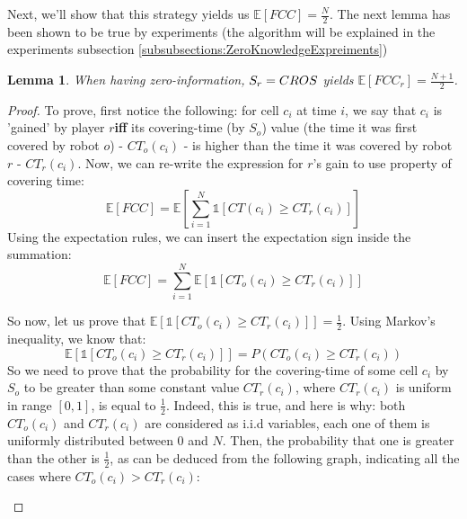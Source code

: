 \documentclass[a4paper,10pt]{article}
\newtheorem{lemma}[theorem]{Lemma}
\newcommand\rob{\ensuremath{r}\xspace}
\newcommand\opp{\ensuremath{o}\xspace}
\newcommand{\fcc}{\ensuremath{FCC}\xspace}
\newcommand{\cros}{\ensuremath{CROS}\xspace}
\begin{document}
Next, we'll show that this strategy yields us $\mathbb{E}[\fcc]=\frac{N}{2}$. The next lemma has been shown to be true by experiments (the algorithm will be explained in the experiments subsection \ref{subsubsections:ZeroKnowledgeExpreiments})

\begin{lemma}\label{lemmas:ZeroKnowledgeEFCC}
When having zero-information, $S_{\rob}=\textbf{\cros}$ yields $\mathbb{E}[\fcc_{\rob}]=\frac{N+1}{2}$.
\end{lemma}

\begin{proof}
To prove, first notice the following: for cell $c_i$ at time $i$, we say that $c_i$ is 'gained' by player \rob \textbf{iff} its covering-time (by $S_o$) value (the time it was first covered by robot \opp) - ${CT}_{\opp}(c_i)$ - is higher than the time it was covered by robot $\rob$ - ${CT}_{\rob}(c_i)$.
Now, we can re-write the expression for \rob's gain to use property of covering time: \[\mathbb{E}[\fcc]=\mathbb{E}\left[\sum_{i=1}^{N}{\mathds{1}\left[CT\left(c_i\right)\geq {CT}_{\rob}(c_i)\right]}\right]\]
Using the expectation rules, we can insert the expectation sign inside the summation: \[\mathbb{E}[\fcc]=\sum_{i=1}^{N}{\mathbb{E}\left[\mathds{1}\left[{CT}_{\opp}(c_i)\geq {CT}_{\rob}(c_i)\right]\right]}\]

So now, let us prove that $\mathbb{E}\left[\mathds{1}\left[{CT}_{\opp}(c_i)\geq {CT}_{\rob}(c_i)\right]\right]=\frac{1}{2}$. 
Using Markov's inequality, we know that: \[\mathbb{E}\left[\mathds{1}\left[{CT}_{\opp}(c_i)\geq {CT}_{\rob}(c_i)\right]\right]=P\left({CT}_{\opp}(c_i)\geq {CT}_{\rob}(c_i)\right)\]
So we need to prove that the probability for the covering-time of some cell $c_i$ by $S_{\opp}$ to be greater than some constant value ${CT}_{\rob}(c_i)$, where ${CT}_{\rob}(c_i)$ is uniform in range $[0,1]$, is equal to $\frac{1}{2}$.
Indeed, this is true, and here is why: both ${CT}_{\opp}(c_i)$ and ${CT}_{\rob}(c_i)$ are considered as i.i.d variables, each one of them is uniformly distributed between $0$ and $N$. Then, the probability that one is greater than the other is $\frac{1}{2}$, as can be deduced from the following graph, indicating all the cases where ${CT}_{\opp}(c_i) > {CT}_{\rob}(c_i)$:

  
     \begin{figure}[thpb]
      \centering
\end{figure}
\end{proof}
\end{document}
